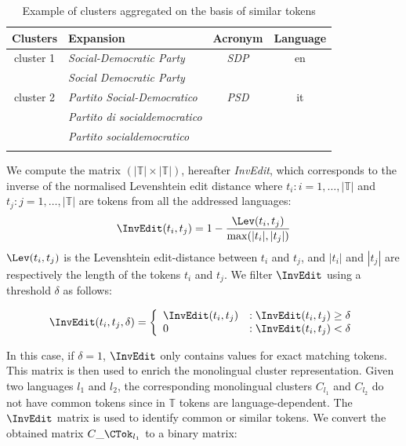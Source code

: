\documentclass[output=paper]{langsci/langscibook}
\begin{document}
\begin{table}[h]
\begin{tabular}{clcc}\lsptoprule
Clusters    &  Expansion  & Acronym  &  Language \\
\midrule
cluster 1  & \itshape  Social-Democratic Party      &  \itshape SDP  & en  \\
           & \itshape  Social Democratic Party      &      &     \\ \midrule
cluster 2  & \itshape  Partito Social-Democratico   &  \itshape PSD  & it \\
           & \itshape  Partito di socialdemocratico &      &    \\
           & \itshape  Partito socialdemocratico   &       &    \\ 
\lspbottomrule
\end{tabular}
\caption{Example of clusters aggregated on the basis of similar tokens}
\label{jac:tab:common token aggregation}
\end{table}


We compute the matrix $(|\mathbb{T}| \times |\mathbb{T}|)$, hereafter
\textit{InvEdit}, which corresponds to the inverse of the normalised
Levenshtein edit distance where $t_i : i = 1,\ldots{},|\mathbb{T}|$ and
$t_j : j = 1,\ldots{},|\mathbb{T}|$ are tokens from all the addressed
languages:
\begin{equation}\label{jac:eq:edit}
\InvEdit(t_i,t_j) = 1 - \frac{\Lev(t_i,t_j)}{\max(|t_i|,|t_j|)} 
\end{equation}
$\Lev(t_i,t_j)$ is the Levenshtein edit-distance between $t_i$ and $t_j$, 
and $|t_i|$ and $|t_j|$ are respectively the length of the tokens $t_i$ 
and $t_j$. We filter $\InvEdit$ using a threshold $\delta$ as follows:

\begin{equation}
\InvEdit(t_i,t_j,\delta) =
\left\{
  \begin{array}{lr}
    \InvEdit(t_i,t_j) & : \InvEdit(t_i,t_j) \ge \delta\\
    0 & : \InvEdit(t_i,t_j) < \delta
  \end{array}
\right.
\end{equation}

In this case, if $\delta = 1$, $\InvEdit$ only contains values for
exact matching tokens.
This matrix is then used to enrich the monolingual cluster
representation.  Given two languages $l_{1}$ and $l_{2}$, the
corresponding monolingual clusters $C_{l_{1}}$ and $C_{l_{2}}$ do not
have common tokens since in $\mathbb{T}$ tokens are
language-dependent. The $\InvEdit$ matrix is used to identify common or
similar tokens. We convert the obtained matrix $C\_\CTok_{l_{1}}$ to a
binary matrix:
\end{document}
